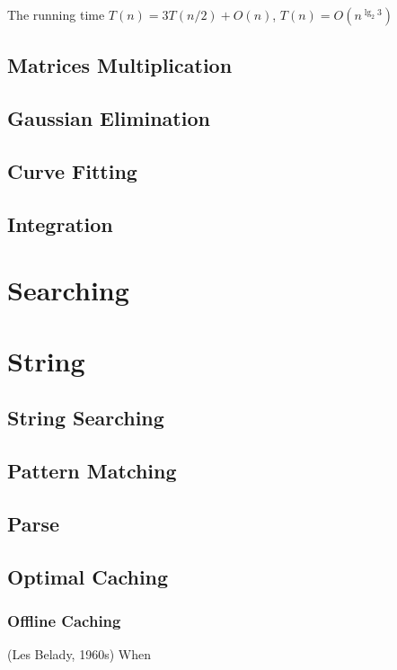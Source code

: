 			The running time $T(n) = 3T(n/2) + O(n)$, $T(n) = O(n^{\lg_2 3})$
		\section{Matrices Multiplication}

		\section{Gaussian Elimination}

		\section{Curve Fitting}

		\section{Integration}

	\chapter{Searching}

	\chapter{String}
		\section{String Searching}

		\section{Pattern Matching}

		\section{Parse}

		\section{Optimal Caching}			
			\subsection{Offline Caching}
				\begin{definition}
					(Les Belady, 1960s) When 
				\end{definition}


